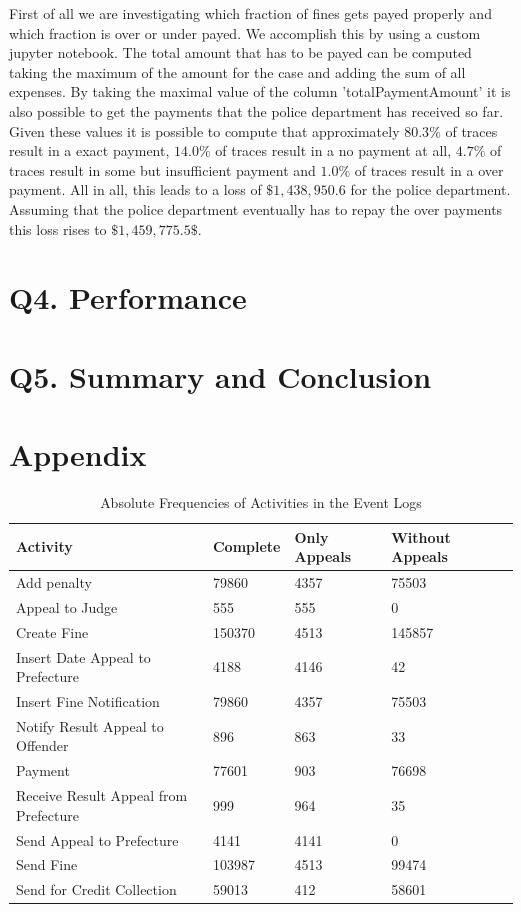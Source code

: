 \documentclass[12pt]{report}
\begin{document}
First of all we are investigating which fraction of fines gets payed properly and which fraction is over or under payed. We accomplish this by using a custom jupyter notebook. The total amount that has to be payed can be computed taking the maximum of the amount for the case and adding the sum of all expenses. By taking the maximal value of the column 'totalPaymentAmount' it is also possible to get the payments that the police department has received so far. Given these values it is possible to compute that approximately $80.3\%$ of traces result in a exact payment, $14.0\%$ of traces result in a no payment at all, $4.7\%$ of traces result in some but insufficient payment and $1.0\%$ of traces result in a over payment. All in all, this leads to a loss of $ \$ 1,438,950.6$ for the police department. Assuming that the police department eventually has to repay the over payments this loss rises to $ \$ 1,459,775.5 \$ $.

\section{Q4. Performance}

\section{Q5. Summary and Conclusion}

\section*{Appendix}

\begin{table}[H]
\centering
\begin{tabular}{|l|l|l|l|l|}
\hline \textbf{Activity} & \textbf{Complete} & \textbf{Only Appeals} & \textbf{Without Appeals} \\
\hline Add penalty & 79860 & 4357 & 75503\\
\hline Appeal to Judge & 555 & 555 &0\\
\hline Create Fine & 150370 & 4513 & 145857\\
\hline Insert Date Appeal to Prefecture & 4188 & 4146 & 42\\
\hline Insert Fine Notification & 79860 & 4357 & 75503\\
\hline Notify Result Appeal to Offender & 896 & 863 & 33\\
\hline Payment  & 77601 & 903 & 76698\\
\hline Receive Result Appeal from Prefecture & 999 & 964 & 35\\
\hline Send Appeal to Prefecture  & 4141 & 4141 & 0\\
\hline Send Fine  & 103987 & 4513 & 99474\\
\hline Send for Credit Collection & 59013 & 412 & 58601\\
\hline
\end{tabular}
\caption{Absolute Frequencies of Activities in the Event Logs}
\label{tab:1c_absolut}
\end{table}
\end{document}

